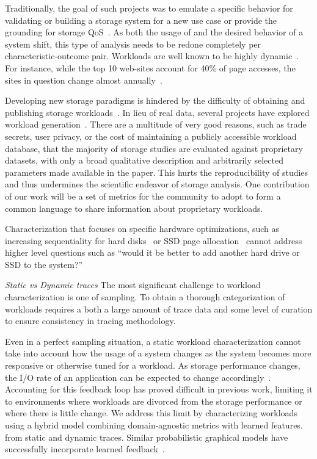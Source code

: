 Traditionally, the goal of such
projects was to emulate a specific behavior for validating or building a
storage system for a new use case or provide the grounding for storage
QoS~\cite{mesnier05}.  As both the usage of and the desired behavior of a system
shift, this type of analysis needs to be redone completely per
characteristic-outcome pair.  Workloads are well known to be highly
dynamic~\cite{uttamchandani2005chameleon}.  For instance, while the top 10 web-sites account for
40\% of page accesses, the sites in question change almost
annually~\cite{avani-systor}.

Developing new storage paradigms is hindered by the difficulty of obtaining and
publishing storage workloads~\cite{ian-tos}. In lieu of real data, several projects
have explored workload
generation~\cite{tarasov2012extracting,ganger1995generating,kurmas2003synthesizing,gomez2000new}.
There are a multitude of very good reasons, such as trade secrets, user
privacy, or the cost of maintaining a publicly accessible workload database,
that the majority of storage studies are evaluated against proprietary
datasets, with only a broad qualitative description and arbitrarily selected parameters made
available in the paper. This hurts the reproducibility of
studies and thus undermines the scientific endeavor of storage analysis.  One
contribution of our work will be a set of metrics for the community to adopt to
form a common language to share information about proprietary workloads.%

Characterization that focuses on specific hardware optimizations, such as
increasing sequentiality for hard disks~\cite{riska2006disk} or SSD page
allocation~\cite{seo_char} cannot address higher level questions such as ``would
it be better to add another hard drive or SSD to the system?''




\textit{Static vs Dynamic traces} 
The most significant challenge to workload characterization is one of sampling.  To obtain
a thorough categorization of workloads requires a both a large amount of trace
data and some level of curation to ensure consistency in tracing methodology.

Even in a perfect sampling situation, a static workload characterization cannot
take into account how the usage of a system changes as the system becomes more
responsive or otherwise tuned for a workload.  As storage performance changes,
the I/O rate of an application can be expected to change
accordingly~\cite{mesnier05}.  Accounting for this feedback loop has proved
difficult in previous work, limiting it to environments where workloads are
divorced from the storage performance or where there is little change.
We address this limit by characterizing workloads using a hybrid model combining
domain-agnostic metrics with learned features. from static and dynamic traces.  Similar probabilistic
graphical models have successfully incorporate learned
feedback~\cite{liu2012feedback}.  %

